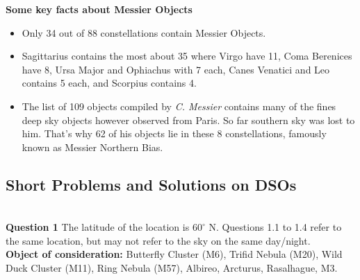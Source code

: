 \documentclass[a4paper,12pt]{extarticle}
\begin{document}
\textbf{Some key facts about Messier Objects}
\begin{itemize}
	\renewcommand{\labelitemi}{\textcolor{orange}{\(\bigstar\)}}
    \item Only 34 out of 88 constellations contain Messier Objects.
    \item Sagittarius contains the most about 35 where Virgo have 11, Coma Berenices have 8, Ursa Major and Ophiachus with 7 each, Canes Venatici and Leo contains 5 each, and Scorpius contains 4.
    \item The list of 109 objects compiled by \textit{C. Messier} contains many of the fines deep sky objects however observed from Paris. So far southern sky was lost to him. That's why 62 of his objects lie in these 8 constellations, famously known as Messier Northern Bias. 
\end{itemize}

\clearpage 
\subsection{Short Problems and Solutions on DSOs}

\\


\textsf{\textbf{Question 1}} The latitude of the location is $60^\circ$ N. Questions 1.1 to 1.4 refer to the same location, but may not refer to the sky on the same day/night. \\

\textbf{Object of consideration:} Butterfly Cluster (M6), Trifid Nebula (M20), Wild Duck Cluster (M11), Ring Nebula (M57), Albireo, Arcturus, Rasalhague, M3.
\end{document}
